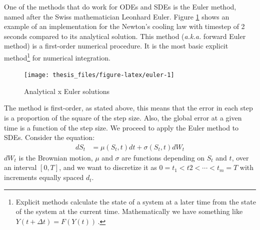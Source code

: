 \documentclass[12pt,twoside]{reedthesis}
\theoremstyle{definition}
\theoremstyle{definition}
\theoremstyle{remark}
\begin{document}
  One of the methods that do work for ODEs and SDEs is the Euler method,
  named after the Swiss mathematician Leonhard Euler. Figure
  \ref{fig:euler} shows an example of an implementation for the Newton's
  cooling law with timestep of 2 seconds compared to its analytical
  solution. This method (\emph{a.k.a.} forward Euler method) is a
  first-order numerical procedure. It is the most basic explicit
  method\footnote{Explicit methods calculate the state of a system at a
    later time from the state of the system at the current time.
    Mathematically we have something like \(Y(t+\Delta t)=F(Y(t))\,\).}
  for numerical integration.
  \begin{figure}
  
  {\centering \texttt{[image: thesis\_files/figure-latex/euler-1]} 
  
  }
  
  \caption{Analytical x Euler solutions \label{euler}}\label{fig:euler}
  \end{figure}
  The method is first-order, as stated above, this means that the error in
  each step is a proportion of the square of the step size. Also, the
  global error at a given time is a function of the step size. We proceed
  to apply the Euler method to SDEs. Consider the equation:
  \begin{align}
  dS_t &= \mu(S_t,t) dt + \sigma(S_t,t) dW_t
  \end{align}
  \(dW_t\) is the Brownian motion, \(\mu\) and \(\sigma\) are functions
  depending on \(S_t\) and \(t\), over an interval \([0,T]\), and we want
  to discretize it as \(0 = t_1 < t2 < \cdots < t_m = T\) with increments
  equally spaced \(d_t\).
  
\end{document}
